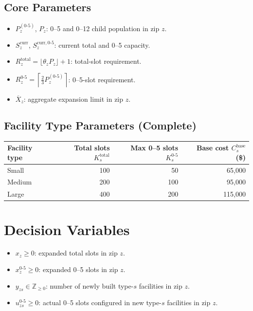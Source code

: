\documentclass[12pt]{article}
\begin{document}
\subsection{Core Parameters}
\begin{itemize}
    \item $P_z^{(0\text{-}5)}$, $P_z$: 0--5 and 0--12 child population in zip $z$.
    \item $S_z^{\mathrm{curr}}$, $S_z^{\mathrm{curr},0\text{-}5}$: current total and 0--5 capacity.
    \item $R_z^{\mathrm{total}}=\lfloor\theta_z P_z\rfloor+1$: total-slot requirement.
    \item $R_z^{0\text{-}5}=\left\lceil\frac{2}{3}P_z^{(0\text{-}5)}\right\rceil$: 0--5-slot requirement.
    \item $\overline{X}_z$: aggregate expansion limit in zip $z$.
\end{itemize}

\subsection{Facility Type Parameters (Complete)}
\begin{table}[h]
\centering
\begin{tabular}{@{}lrrr@{}}
\toprule
Facility type & Total slots $K_s^{\mathrm{total}}$ & Max 0--5 slots $K_s^{0\text{-}5}$ & Base cost $C_s^{\mathrm{base}}$ (\$) \\
\midrule
Small  & 100 & 50  & 65,000 \\
Medium & 200 & 100 & 95,000 \\
Large  & 400 & 200 & 115,000 \\
\bottomrule
\end{tabular}
\end{table}

\section{Decision Variables}
\begin{itemize}
    \item $x_z \ge 0$: expanded total slots in zip $z$.
    \item $x_z^{0\text{-}5} \ge 0$: expanded 0--5 slots in zip $z$.
    \item $y_{zs} \in \mathbb{Z}_{\ge 0}$: number of newly built type-$s$ facilities in zip $z$.
    \item $u_{zs}^{0\text{-}5} \ge 0$: actual 0--5 slots configured in new type-$s$ facilities in zip $z$.
\end{itemize}
\end{document}
